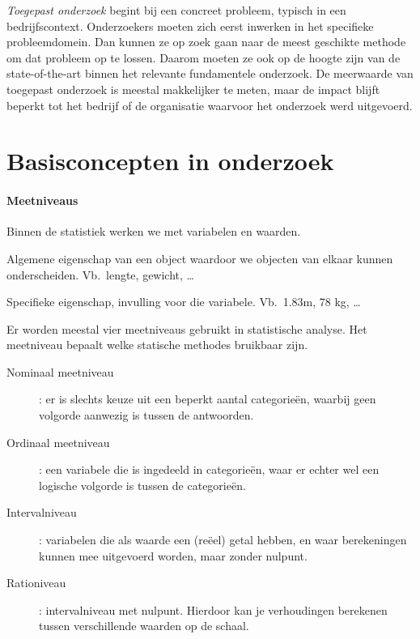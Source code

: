 \emph{Toegepast onderzoek} begint bij een concreet probleem, typisch in een bedrijfscontext. Onderzoekers moeten zich eerst inwerken in het specifieke probleemdomein. Dan kunnen ze op zoek gaan naar de meest geschikte methode om dat probleem op te lossen. Daarom moeten ze ook op de hoogte zijn van de state-of-the-art binnen het relevante fundamentele onderzoek. De meerwaarde van toegepast onderzoek is meestal makkelijker te meten, maar de impact blijft beperkt tot het bedrijf of de organisatie waarvoor het onderzoek werd uitgevoerd.

\section{Basisconcepten in onderzoek}

\paragraph{Meetniveaus}

Binnen de statistiek werken we met variabelen en waarden.

\begin{definition}[Variabele] 
  Algemene eigenschap van een object waardoor we objecten van elkaar kunnen onderscheiden. Vb.~lengte, gewicht, \ldots
\end{definition}  
\begin{definition}[Waarde]
  Specifieke eigenschap, invulling voor die variabele. Vb.~1.83m, 78 kg, \ldots
\end{definition}

Er worden meestal vier meetniveaus gebruikt in statistische analyse. Het meetniveau bepaalt welke statische methodes bruikbaar zijn.

\begin{description}
  \item [Nominaal meetniveau] : er is slechts keuze uit een beperkt aantal categorie\"en, waarbij geen volgorde aanwezig is tussen de antwoorden.
  \item [Ordinaal meetniveau] : een variabele die is ingedeeld in categorie\"en, waar er echter wel een logische volgorde is tussen de categorie\"en. 
  \item [Intervalniveau] : variabelen die als waarde een (re\"eel) getal hebben, en waar berekeningen kunnen mee uitgevoerd worden, maar zonder nulpunt.
  \item [Rationiveau] : intervalniveau met nulpunt. Hierdoor kan je verhoudingen berekenen tussen verschillende waarden op de schaal.
\end{description}

